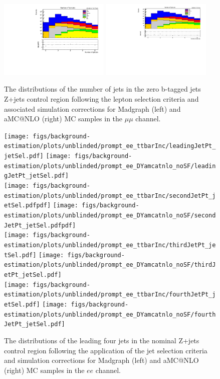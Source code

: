 \begin{figure}[tbp]
\centering
\includegraphics[width=0.47\textwidth]{figs/background-estimation/plots/unblinded/DY_control_old_prompt_mumu_ttbarInc/nJets_lepSel.pdf}
\includegraphics[width=0.47\textwidth]{figs/background-estimation/plots/unblinded/DY_control_old_prompt_mumu_DYamcatnlo_noSF/nJets_lepSel.pdf}
\caption{
The distributions of the number of jets in the zero b-tagged jets Z+jets control region following the lepton selection criteria and associated simulation corrections for Madgraph (left) and aMC@NLO (right) MC samples in the $\mu\mu$ channel.
}
\label{fig:zPlusCR_nJets}
\end{figure}

\begin{figure}[tbp]
\centering
\texttt{[image: figs/background-estimation/plots/unblinded/prompt\_ee\_ttbarInc/leadingJetPt\_jetSel.pdf]}
\texttt{[image: figs/background-estimation/plots/unblinded/prompt\_ee\_DYamcatnlo\_noSF/leadingJetPt\_jetSel.pdf]}
\\
\texttt{[image: figs/background-estimation/plots/unblinded/prompt\_ee\_ttbarInc/secondJetPt\_jetSel.pdfpdf]}
\texttt{[image: figs/background-estimation/plots/unblinded/prompt\_ee\_DYamcatnlo\_noSF/secondJetPt\_jetSel.pdfpdf]}
\\
\texttt{[image: figs/background-estimation/plots/unblinded/prompt\_ee\_ttbarInc/thirdJetPt\_jetSel.pdf]}
\texttt{[image: figs/background-estimation/plots/unblinded/prompt\_ee\_DYamcatnlo\_noSF/thirdJetPt\_jetSel.pdf]}
\\
\texttt{[image: figs/background-estimation/plots/unblinded/prompt\_ee\_ttbarInc/fourthJetPt\_jetSel.pdf]}
\texttt{[image: figs/background-estimation/plots/unblinded/prompt\_ee\_DYamcatnlo\_noSF/fourthJetPt\_jetSel.pdf]}
\caption{
The distributions of the leading four jets \pt in the nominal Z+jets control region following the application of the jet selection criteria and simulation corrections for Madgraph (left) and aMC@NLO (right) MC samples in the $ee$ channel.
}
\label{fig:zPlusCR_jetPt}
\end{figure}


